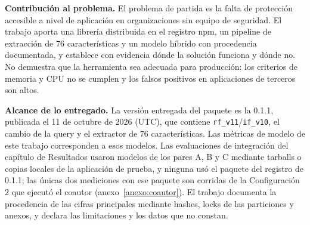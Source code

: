 \textbf{Contribución al problema.} El problema de partida es la falta de protección accesible a nivel de aplicación en organizaciones sin equipo de seguridad. El trabajo aporta una librería distribuida en el registro npm, un pipeline de extracción de 76 características y un modelo híbrido con procedencia documentada, y establece con evidencia dónde la solución funciona y dónde no. No demuestra que la herramienta sea adecuada para producción: los criterios de memoria y CPU no se cumplen y los falsos positivos en aplicaciones de terceros son altos.

\textbf{Alcance de lo entregado.} La versión entregada del paquete es la 0.1.1, publicada el 11 de octubre de 2026 (UTC), que contiene \texttt{rf\_v11}/\texttt{if\_v10}, el cambio de la query y el extractor de 76 características. Las métricas de modelo de este trabajo corresponden a esos modelos. Las evaluaciones de integración del capítulo de Resultados usaron modelos de los pares A, B y C mediante tarballs o copias locales de la aplicación de prueba, y ninguna usó el paquete del registro de 0.1.1; las únicas dos mediciones con ese paquete son corridas de la Configuración 2 que ejecutó el coautor (anexo~\ref{anexo:coautor}). El trabajo documenta la procedencia de las cifras principales mediante hashes, locks de las particiones y anexos, y declara las limitaciones y los datos que no constan.
